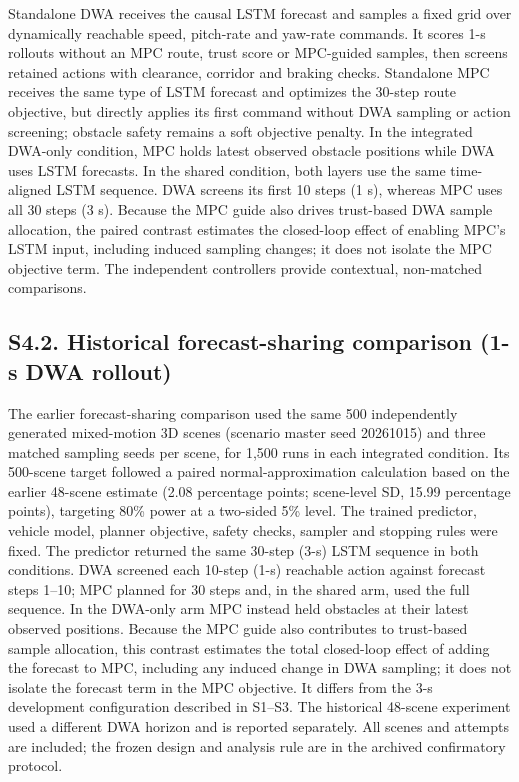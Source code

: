 \documentclass[10pt]{article}
\begin{document}
Standalone DWA receives the causal LSTM forecast and samples a fixed grid over dynamically reachable speed, pitch-rate and yaw-rate commands. It scores 1-s rollouts without an MPC route, trust score or MPC-guided samples, then screens retained actions with clearance, corridor and braking checks. Standalone MPC receives the same type of LSTM forecast and optimizes the 30-step route objective, but directly applies its first command without DWA sampling or action screening; obstacle safety remains a soft objective penalty. In the integrated DWA-only condition, MPC holds latest observed obstacle positions while DWA uses LSTM forecasts. In the shared condition, both layers use the same time-aligned LSTM sequence. DWA screens its first 10 steps (1 s), whereas MPC uses all 30 steps (3 s). Because the MPC guide also drives trust-based DWA sample allocation, the paired contrast estimates the closed-loop effect of enabling MPC's LSTM input, including induced sampling changes; it does not isolate the MPC objective term. The independent controllers provide contextual, non-matched comparisons.

\subsection*{S4.2. Historical forecast-sharing comparison (1-s DWA rollout)}
The earlier forecast-sharing comparison used the same 500 independently generated mixed-motion 3D scenes (scenario master seed 20261015) and three matched sampling seeds per scene, for 1,500 runs in each integrated condition. Its 500-scene target followed a paired normal-approximation calculation based on the earlier 48-scene estimate (2.08 percentage points; scene-level SD, 15.99 percentage points), targeting 80\% power at a two-sided 5\% level. The trained predictor, vehicle model, planner objective, safety checks, sampler and stopping rules were fixed. The predictor returned the same 30-step (3-s) LSTM sequence in both conditions. DWA screened each 10-step (1-s) reachable action against forecast steps 1--10; MPC planned for 30 steps and, in the shared arm, used the full sequence. In the DWA-only arm MPC instead held obstacles at their latest observed positions. Because the MPC guide also contributes to trust-based sample allocation, this contrast estimates the total closed-loop effect of adding the forecast to MPC, including any induced change in DWA sampling; it does not isolate the forecast term in the MPC objective. It differs from the 3-s development configuration described in S1--S3. The historical 48-scene experiment used a different DWA horizon and is reported separately. All scenes and attempts are included; the frozen design and analysis rule are in the archived confirmatory protocol.
\end{document}
